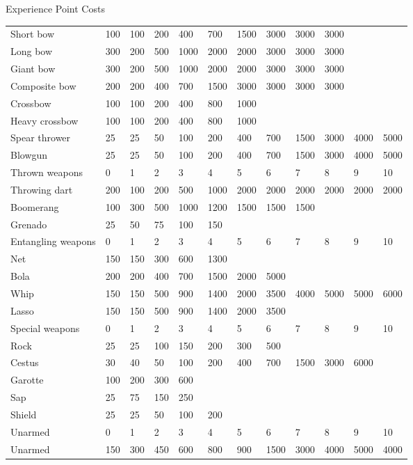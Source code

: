 \begin{Tables}{Experience Point Costs}
\begin{tabularx}{\linewidth}{Xlllllllllll}
Short bow		& 100	& 100 	& 200	& 400	& 700	& 1500	& 3000	& 3000	& 3000	& 	&  \\
Long bow		& 300	& 200 	& 500	& 1000	& 2000	& 2000	& 3000	& 3000	& 3000	& 	&  \\
Giant bow		& 300	& 200 	& 500	& 1000	& 2000	& 2000	& 3000	& 3000	& 3000	& 	&  \\
Composite bow		& 200	& 200 	& 400	& 700	& 1500	& 3000	& 3000	& 3000	& 3000	& 	&  \\
Crossbow		& 100	& 100 	& 200	& 400	& 800	& 1000	& 	& 	& 	& 	&  \\
Heavy crossbow		& 100	& 100 	& 200	& 400	& 800	& 1000	& 	& 	& 	& 	&  \\
Spear thrower		& 25	& 25 	& 50	& 100	& 200	& 400	& 700	& 1500	& 3000	& 4000	& 5000 \\
Blowgun			& 25	& 25 	& 50	& 100	& 200	& 400	& 700	& 1500	& 3000	& 4000	& 5000 \\ \hline
Thrown weapons		& 0	& 1 	& 2	& 3	& 4	& 5	& 6	& 7	& 8	& 9	& 10 \\
Throwing dart		& 200	& 100 	& 200	& 500	& 1000	& 2000	& 2000	& 2000	& 2000	& 2000	& 2000 \\
Boomerang		& 100	& 300 	& 500	& 1000	& 1200	& 1500	& 1500	& 1500	& 	& 	&  \\
Grenado			& 25	& 50 	& 75	& 100	& 150	& 	& 	& 	& 	& 	&  \\ \hline
Entangling weapons	& 0	& 1	& 2	& 3	& 4	& 5 	& 6	& 7	& 8	& 9	& 10 \\ \hline
Net			& 150	& 150 	& 300	& 600	& 1300	& 	& 	& 	& 	& 	&  \\
Bola			& 200	& 200	& 400	& 700	& 1500	& 2000	& 5000	& 	& 	& 	&  \\
Whip			& 150	& 150 	& 500	& 900	& 1400	& 2000	& 3500	& 4000	& 5000	& 5000	& 6000 \\
Lasso			& 150	& 150	& 500	& 900	& 1400	& 2000	& 3500	& 	& 	& 	&  \\
Special weapons		& 0	& 1 	& 2	& 3	& 4	& 5	& 6	& 7	& 8	& 9	& 10 \\
Rock			& 25	& 25 	& 100	& 150	& 200	& 300	& 500	& 	& 	& 	&  \\
Cestus			& 30	& 40	& 50	& 100	& 200	& 400	& 700	& 1500	& 3000	& 6000	&  \\
Garotte			& 100	& 200	& 300	& 600	& 	& 	& 	& 	& 	& 	&  \\
Sap			& 25	& 75	& 150	& 250	& 	& 	& 	& 	& 	& 	&  \\
Shield			& 25	& 25	& 50	& 100	& 200	& 	& 	& 	& 	& 	&  \\ \hline
Unarmed			& 0	& 1 	& 2	& 3	& 4	& 5	& 6	& 7	& 8	& 9	& 10 \\ \hline
Unarmed			& 150	& 300 	& 450	& 600	& 800	& 900	& 1500	& 3000	& 4000	& 5000	& 4000 \\
\end{tabularx}



\end{Tables}
